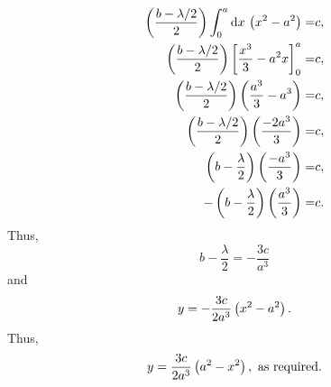 \begin{question}
\begin{align*}
\left(\dfrac{b-\lambda/2}{2}\right) \int_{0}^{a}\mathrm{d} x\,\left(x^2-a^2\right) =& c,\\
\left(\dfrac{b-\lambda/2}{2}\right)\left[\frac{x^3}{3}-a^2x\right]_0^a=&c,\\
\left(\dfrac{b-\lambda/2}{2}\right)\left(\frac{a^3}{3}-a^3\right) =& c,\\
\left(\dfrac{b-\lambda/2}{2}\right)\left(\frac{-2a^3}{3}\right) =& c,\\
\left(b-\frac{\lambda}{2}\right)\left(\frac{-a^3}{3}\right) =& c,\\
-\left(b-\frac{\lambda}{2}\right)\left(\frac{a^3}{3}\right) =& c.
\end{align*}
Thus, 
\[b-\dfrac{\lambda}{2} = -\dfrac{3c}{a^3}\] and \[y=-\dfrac{3c}{2a^3}\left(x^2-a^2\right).\]
Thus, \[y=\dfrac{3c}{2a^3}\left(a^2-x^2\right), \text{ as required}.\]
\end{question}
